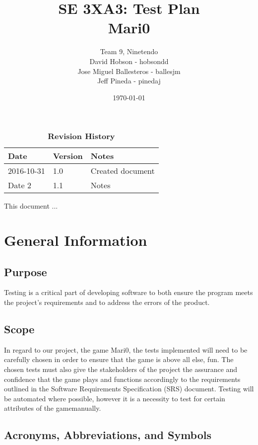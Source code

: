 \documentclass[12pt, titlepage]{article}
\title{SE 3XA3: Test Plan\\Mari0}
\author{Team 9, Ninetendo
		\\ David Hobson - hobsondd
		\\ Jose Miguel Ballesteros - ballesjm
		\\ Jeff Pineda - pinedaj
}
\date{\today}
\begin{document}
\maketitle

\tableofcontents
\listoftables
\listoffigures

\begin{table}[bp]
\caption{\bf Revision History}
\begin{tabularx}{\textwidth}{p{3cm}p{2cm}X}
\toprule {\bf Date} & {\bf Version} & {\bf Notes}\\
\midrule
2016-10-31 & 1.0 & Created document\\
Date 2 & 1.1 & Notes\\
\bottomrule
\end{tabularx}
\end{table}

\newpage


This document ...

\section{General Information}

\subsection{Purpose}
Testing is a critical part of developing software to both ensure the program meets the project's requirements and to address the errors of the product. 
\subsection{Scope}
In regard to our project, the game Mari0, the tests implemented will need to be carefully chosen in order to ensure that the game is above all else, fun. The chosen tests must also give the stakeholders of the project the assurance and confidence that the game plays and functions accordingly to the requirements outlined in the Software Requirements Specification (SRS) document. Testing will be automated where possible, however it is a necessity to test for certain attributes of the gamemanually.
\subsection{Acronyms, Abbreviations, and Symbols}
	
\end{document}
